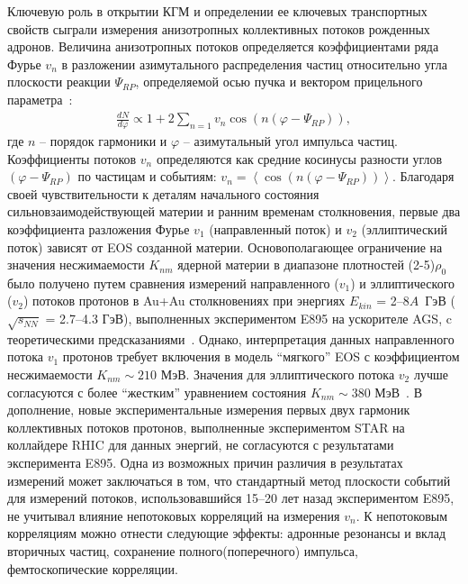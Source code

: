 Ключевую роль в открытии  КГМ  и  определении ее ключевых транспортных свойств сыграли измерения анизотропных коллективных потоков рожденных адронов. 
Величина анизотропных потоков определяется коэффициентами ряда Фурье $v_n$ в разложении азимутального распределения частиц относительно угла плоскости реакции $\Psi_{RP}$, определяемой осью пучка и вектором прицельного параметра~\cite{Voloshin:2008dg}:
\begin{eqnarray}
   \frac{dN}{d\varphi} \propto 1 + 2 \sum_{n=1} v_n \cos\left( n \left( \varphi - \Psi_{RP} \right) \right),
\end{eqnarray}
%
где $n$ -- порядок гармоники и  $\varphi$ -- азимутальный угол импульса частиц.
Коэффициенты потоков  $v_n$ определяются как средние косинусы разности углов  $\left( \varphi - \Psi_{RP} \right)$ по частицам и событиям: $v_n=\left\langle \cos\left( n \left( \varphi - \Psi_{RP} \right) \right) \right\rangle$.
Благодаря своей чувствительности к деталям начального состояния сильновзаимодействующей материи и ранним временам столкновения, первые два коэффициента разложения Фурье $v_1$ (направленный поток) и $v_2$ (эллиптический поток) зависят от EOS созданной материи.
Основополагающее ограничение на значения несжимаемости $K_{nm}$ ядерной материи  в диапазоне плотностей (2-5)$\rho_{0}$ было получено путем сравнения измерений направленного ($v_1$) и эллиптического ($v_2$)  потоков  протонов в Au+Au столкновениях при энергиях  $E_{kin}$ = 2--8$A$~ГэВ ($\sqrt{s_{NN}}$ = 2.7--4.3 ГэВ), выполненных экспериментом E895 на ускорителе AGS, c теоретическими предсказаниями~\cite{E895:1999ldn,E895:2000maf,E895:2001axb}. 
Однако, интерпретация данных направленного потока $v_1$ протонов требует включения в модель ``мягкого'' EOS с коэффициентом несжимаемости $K_{nm} \sim 210$ МэВ. 
Значения  для эллиптического потока $v_2$ лучше согласуются с более ``жестким'' уравнением состояния $K_{nm} \sim 380$ МэВ~\cite{Danielewicz:2002pu}. 
В дополнение, новые экспериментальные измерения первых двух гармоник коллективных потоков протонов, выполненные экспериментом  STAR на коллайдере RHIC для данных энергий, не согласуются с результатами эксперимента E895. Одна из возможных причин различия в результатах измерений может заключаться в том, что стандартный метод плоскости событий для измерений потоков, использовавшийся 15–20 лет назад экспериментом E895, не учитывал влияние непотоковых корреляций  на измерения $v_n$. 
К непотоковым корреляциям можно отнести следующие эффекты: адронные резонансы и вклад вторичных частиц, сохранение полного(поперечного) импульса, фемтоскопические корреляции. 
